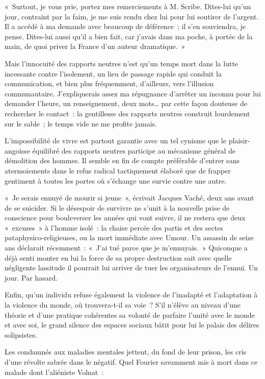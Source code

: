 \documentclass[french,twoside]{book} %
\newenvironment{quoteblock}%
  {\begin{quoting}}
  {\end{quoting}}
\newenvironment{quotebar}{%
    \def\FrameCommand{{\color{rubric!10!}\vrule width 0.5em} \hspace{0.9em}}%
    \def\OuterFrameSep{\itemsep} %
    \MakeFramed {\advance\hsize-\width \FrameRestore}
  }%
  {%
    \endMakeFramed
  }
\renewenvironment{quoteblock}%
  {%
    \savenotes
    \setstretch{0.9}
    \normalfont
    \begin{quotebar}
  }
  {%
    \end{quotebar}
    \spewnotes
  }
\begin{document}
\begin{quoteblock}
 \noindent « Surtout, je vous prie, portez mes remerciements à M. Scribe. Dites-lui qu’un jour, contraint par la faim, je me suis rendu chez lui pour lui soutirer de l’argent. Il a accédé à ma demande avec beaucoup de déférence ; il s’en souviendra, je pense. Dites-lui aussi qu’il a bien fait, car j’avais dans ma poche, à portée de la main, de quoi priver la France d’un auteur dramatique. »
 \end{quoteblock}

\noindent Mais l’innocuité des rapports neutres n’est qu’un temps mort dans la lutte incessante contre l’isolement, un lieu de passage rapide qui conduit la communication, et bien plus fréquemment, d’ailleurs, vers l’illusion communautaire. J’expliquerais assez ma répugnance d’arrêter un inconnu pour lui demander l’heure, un renseignement, deux mots… par cette façon douteuse de rechercher le contact : la gentillesse des rapports neutres construit lourdement sur le sable ; le temps vide ne me profite jamais.\par
L’impossibilité de vivre est partout garantie avec un tel cynisme que le plaisir-angoisse équilibré des rapports neutres participe au mécanisme général de démolition des hommes. Il semble en fin de compte préférable d’entrer sans atermoiements dans le refus radical tactiquement élaboré que de frapper gentiment à toutes les portes où s’échange une survie contre une autre.\par
« Je serais ennuyé de mourir si jeune », écrivait Jacques Vaché, deux ans avant de se suicider. Si le désespoir de survivre ne s’unit à la nouvelle prise de conscience pour bouleverser les années qui vont suivre, il ne restera que deux « excuses » à l’homme isolé : la chaise percée des partis et des sectes pataphysico-religieuses, ou la mort immédiate avec Umour. Un assassin de seize ans déclarait récemment : « J’ai tué parce que je m’ennuyais. » Quiconque a déjà senti monter en lui la force de sa propre destruction sait avec quelle négligente lassitude il pourrait lui arriver de tuer les organisateurs de l’ennui. Un jour. Par hasard.\par
Enfin, qu’un individu refuse également la violence de l’inadapté et l’adaptation à la violence du monde, où trouvera-t-il sa voie ? S’il n’élève au niveau d’une théorie et d’une pratique cohérentes sa volonté de parfaire l’unité avec le monde et avec soi, le grand silence des espaces sociaux bâtit pour lui le palais des délires solipsistes.\par
Les condamnés aux maladies mentales jettent, du fond de leur prison, les cris d’une révolte sabrée dans le négatif. Quel Fourier savamment mis à mort dans ce malade dont l’aliéniste Volnat :\par
\end{document}
